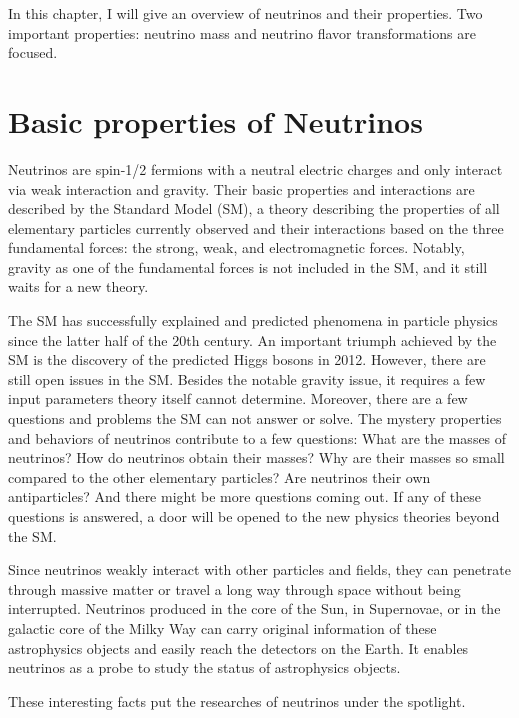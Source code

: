 In this chapter, I will give an overview of neutrinos and their properties. Two important properties: neutrino mass and neutrino flavor transformations are focused.  

\section{Basic properties of Neutrinos}



Neutrinos are spin-1/2 fermions with a neutral electric charges and only interact via weak interaction and gravity. Their basic properties and interactions are described by the Standard Model (SM), a theory describing the properties of all elementary particles currently observed and their interactions based on the three fundamental forces: the strong, weak, and electromagnetic forces. Notably, gravity as one of the fundamental forces is not included in the SM, and it still waits for a new theory. 

The SM has successfully explained and predicted phenomena in particle physics since the latter half of the 20th century. An important triumph achieved by the SM is the discovery of the predicted Higgs bosons in 2012. However, there are still open issues in the SM. Besides the notable gravity issue, it requires a few input parameters theory itself cannot determine. Moreover, there are a few questions and problems the SM can not answer or solve. The mystery properties and behaviors of neutrinos contribute to a few questions: What are the masses of neutrinos? How do neutrinos obtain their masses? Why are their masses so small compared to the other elementary particles? Are neutrinos their own antiparticles? And there might be more questions coming out. If any of these questions is answered, a door will be opened to the new physics theories beyond the SM.

Since neutrinos weakly interact with other particles and fields, they can penetrate through massive matter or travel a long way through space without being interrupted. Neutrinos produced in the core of the Sun, in Supernovae, or in the galactic core of the Milky Way can carry original information of these astrophysics objects and easily reach the detectors on the Earth. It enables neutrinos as a probe to study the status of astrophysics objects.

These interesting facts put the researches of neutrinos under the spotlight. 





